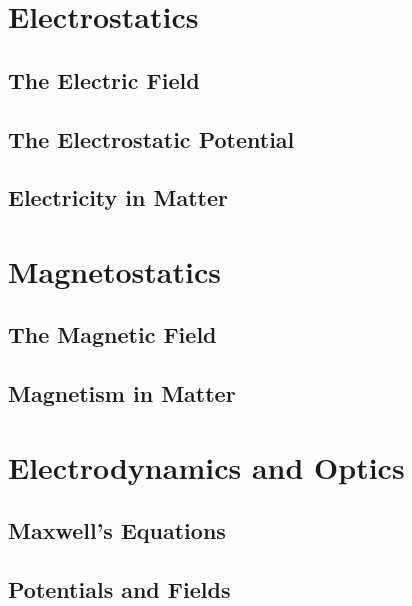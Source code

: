 \documentclass{book}
\theoremstyle{definition}
\theoremstyle{remark}
\begin{document}

\tableofcontents
\part{Electrostatics}
\chapter{The Electric Field}
%

\chapter{The Electrostatic Potential}

\chapter{Electricity in Matter}

\part{Magnetostatics}
\chapter{The Magnetic Field}

\chapter{Magnetism in Matter}

\part{Electrodynamics and Optics}
\chapter{Maxwell's Equations}

\chapter{Potentials and Fields}

\end{document}
